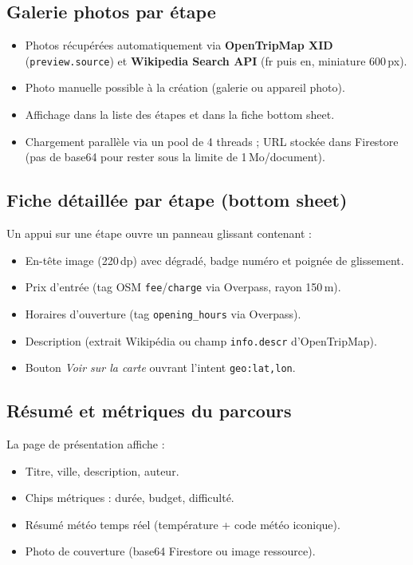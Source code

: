 \documentclass[a4paper,11pt]{article}
\begin{document}
\subsection{Galerie photos par étape}
\begin{itemize}[leftmargin=1.5em]
  \item Photos récupérées automatiquement via \textbf{OpenTripMap XID}
        (\texttt{preview.source}) et \textbf{Wikipedia Search API}
        (fr puis en, miniature 600\,px).
  \item Photo manuelle possible à la création (galerie ou appareil photo).
  \item Affichage dans la liste des étapes et dans la fiche bottom sheet.
  \item Chargement parallèle via un pool de 4 threads ; URL stockée dans
        Firestore (pas de base64 pour rester sous la limite de 1\,Mo/document).
\end{itemize}

\subsection{Fiche détaillée par étape (bottom sheet)}
Un appui sur une étape ouvre un panneau glissant contenant :
\begin{itemize}[leftmargin=1.5em]
  \item En-tête image (220\,dp) avec dégradé, badge numéro et poignée de glissement.
  \item Prix d'entrée (tag OSM \texttt{fee}/\texttt{charge} via Overpass, rayon 150\,m).
  \item Horaires d'ouverture (tag \texttt{opening\_hours} via Overpass).
  \item Description (extrait Wikipédia ou champ \texttt{info.descr} d'OpenTripMap).
  \item Bouton \textit{Voir sur la carte} ouvrant l'intent \texttt{geo:lat,lon}.
\end{itemize}

\subsection{Résumé et métriques du parcours}
La page de présentation affiche :
\begin{itemize}[leftmargin=1.5em]
  \item Titre, ville, description, auteur.
  \item Chips métriques : durée, budget, difficulté.
  \item Résumé météo temps réel (température + code météo iconique).
  \item Photo de couverture (base64 Firestore ou image ressource).
\end{itemize}
\end{document}
